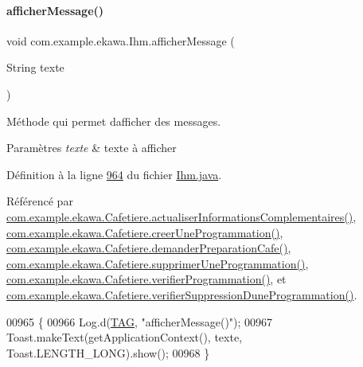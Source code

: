 \mbox{\label{classcom_1_1example_1_1ekawa_1_1_ihm_ab1ca33ad18d42540299e3a58a82f4d9a}} 
\paragraph{\texorpdfstring{afficher\+Message()}{afficherMessage()}}
{\footnotesize\ttfamily void com.\+example.\+ekawa.\+Ihm.\+afficher\+Message (\begin{DoxyParamCaption}\item[{String}]{texte }\end{DoxyParamCaption})}



Méthode qui permet d\textquotesingle{}afficher des messages. 


\begin{DoxyParams}{Paramètres}
{\em texte} & texte à afficher \\
\hline
\end{DoxyParams}


Définition à la ligne \hyperlink{_ihm_8java_source_l00964}{964} du fichier \hyperlink{_ihm_8java_source}{Ihm.\+java}.



Référencé par \hyperlink{_cafetiere_8java_source_l00574}{com.\+example.\+ekawa.\+Cafetiere.\+actualiser\+Informations\+Complementaires()}, \hyperlink{_cafetiere_8java_source_l00731}{com.\+example.\+ekawa.\+Cafetiere.\+creer\+Une\+Programmation()}, \hyperlink{_cafetiere_8java_source_l00397}{com.\+example.\+ekawa.\+Cafetiere.\+demander\+Preparation\+Cafe()}, \hyperlink{_cafetiere_8java_source_l00820}{com.\+example.\+ekawa.\+Cafetiere.\+supprimer\+Une\+Programmation()}, \hyperlink{_cafetiere_8java_source_l00606}{com.\+example.\+ekawa.\+Cafetiere.\+verifier\+Programmation()}, et \hyperlink{_cafetiere_8java_source_l00804}{com.\+example.\+ekawa.\+Cafetiere.\+verifier\+Suppression\+Dune\+Programmation()}.


\begin{DoxyCode}
00965     \{
00966         Log.d(\hyperlink{classcom_1_1example_1_1ekawa_1_1_ihm_a95cd92c2acaf9f8982302da08d94f9aa}{TAG}, \textcolor{stringliteral}{"afficherMessage()"});
00967         Toast.makeText(getApplicationContext(), texte, Toast.LENGTH\_LONG).show();
00968     \}
\end{DoxyCode}
\mbox{\label{classcom_1_1example_1_1ekawa_1_1_ihm_a30e0dc3bf57b1abc608cb8b932527566}} 
